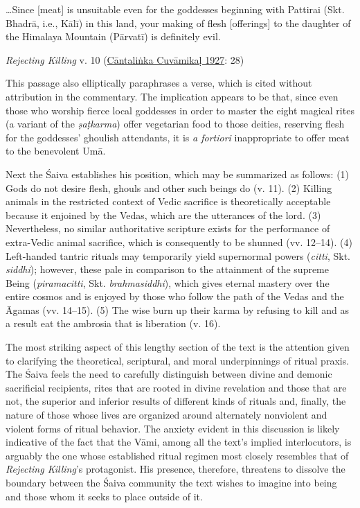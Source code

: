 \begin{pullquote}


	
	    …Since [meat] is unsuitable even for the goddesses beginning with Pattirai (Skt. Bhadrā, i.e., Kālī) in this land, your making of flesh [offerings] to the daughter of the Himalaya Mountain (Pārvatī) is definitely evil.
	  

\medskip\hfill\begin{minipage}{0.9\textwidth}\small\hfill
\emph{Rejecting Killing} v. 10 (\hyperref[CantalinkaCuvamikal1927]{Cāntaliṅka Cuvāmikaḷ 1927}: 28)\end{minipage}\hspace{2em}
\end{pullquote}

This passage also elliptically paraphrases a verse, which is cited without attribution in the commentary. The implication appears to be that, since even those who worship fierce local goddesses in order to master the eight magical rites (a variant of the \emph{ṣaṭkarma}) offer vegetarian food to those deities, reserving flesh for the goddesses’ ghoulish attendants, it is \emph{a fortiori} inappropriate to offer meat to the benevolent Umā.


Next the Śaiva establishes his position, which may be summarized as follows: (1) Gods do not desire flesh, ghouls and other such beings do (v. 11). (2) Killing animals in the restricted context of Vedic sacrifice is theoretically acceptable because it enjoined by the Vedas, which are the utterances of the lord. (3) Nevertheless, no similar authoritative scripture exists for the performance of extra-Vedic animal sacrifice, which is consequently to be shunned (vv. 12–14). (4) Left-handed tantric rituals may temporarily yield supernormal powers (\emph{citti}, Skt. \emph{siddhi}); however, these pale in comparison to the attainment of the supreme Being (\emph{piramacitti}, Skt. \emph{brahmasiddhi}), which gives eternal mastery over the entire cosmos and is enjoyed by those who follow the path of the Vedas and the Āgamas (vv. 14–15). (5) The wise burn up their karma by refusing to kill and as a result eat the ambrosia that is liberation (v. 16).


The most striking aspect of this lengthy section of the text is the attention given to clarifying the theoretical, scriptural, and moral underpinnings of ritual praxis. The Śaiva feels the need to carefully distinguish between divine and demonic sacrificial recipients, rites that are rooted in divine revelation and those that are not, the superior and inferior results of different kinds of rituals and, finally, the nature of those whose lives are organized around alternately nonviolent and violent forms of ritual behavior. The anxiety evident in this discussion is likely indicative of the fact that the Vāmi, among all the text’s implied interlocutors, is arguably the one whose established ritual regimen most closely resembles that of \emph{Rejecting Killing}’s protagonist. His presence, therefore, threatens to dissolve the boundary between the Śaiva community the text wishes to imagine into being and those whom it seeks to place outside of it.


